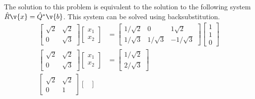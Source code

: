 \documentclass[11pt]{article}
\begin{document}
\begin{enumerate}
\begin{enumerate}
                The solution to this problem is equivalent to the solution to
                the following system $\hat{R}\v{x} = \hat{Q}^*\v{b}$.
                This system can be solved using backsubstitution.
                \begin{align*}
                    \begin{bmatrix}
                        \sqrt{2} & \sqrt{2} \\
                        0 & \sqrt{3}
                    \end{bmatrix}
                    \begin{bmatrix}
                        x_1 \\
                        x_2
                    \end{bmatrix} &=
                    \begin{bmatrix}
                        1/\sqrt{2} & 0 & 1\sqrt{2} \\
                        1/\sqrt{3} & 1/\sqrt{3} & -1/\sqrt{3}
                    \end{bmatrix}
                    \begin{bmatrix}
                        1 \\
                        1 \\
                        0
                    \end{bmatrix} \\
                    \begin{bmatrix}
                        \sqrt{2} & \sqrt{2} \\
                        0 & \sqrt{3}
                    \end{bmatrix}
                    \begin{bmatrix}
                        x_1 \\
                        x_2
                    \end{bmatrix} &=
                    \begin{bmatrix}
                        1/\sqrt{2} \\
                        2/\sqrt{3}
                    \end{bmatrix} \\
                    \begin{bmatrix}
                        \sqrt{2} & \sqrt{2} \\
                        0 & 1
                    \end{bmatrix}
                    \begin{bmatrix}

\end{bmatrix}
\end{align*}
\end{enumerate}
\end{enumerate}
\end{document}
